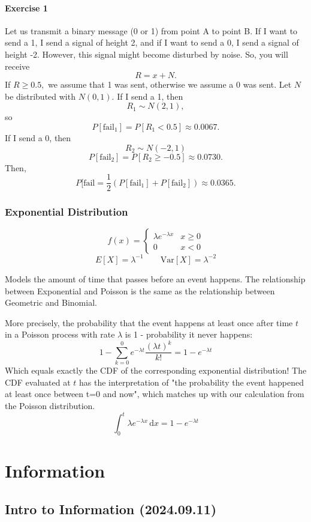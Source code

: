 \documentclass[12pt]{article}
\newcommand{\diffn}[1]{\,\mathrm{d}{#1}}
\begin{document}
\paragraph{Exercise 1}
Let us transmit a binary message (0 or 1) from point A to point B. If I want to send a 1, I send a signal of height 2, and if I want to send a 0, I send a signal of height -2. However, this signal might become disturbed by noise. So, you will receive
\[R=x+N.\]
If $R\ge 0.5,$ we assume that 1 was sent, otherwise we assume a 0 was sent.
Let $N$ be distributed with $N(0,1).$
If I send a 1, then
\[R_1\sim N(2,1),\]
so
\[P[\text{fail}_1]=P[R_1< 0.5]\approx 0.0067.\]
If I send a 0,
then
\[R_2\sim N(-2,1)\]
\[P[\text{fail}_2]=P[R_2\ge -0.5]\approx 0.0730.\]
Then,
\[P[\text{fail}=\frac{1}{2}(P[\text{fail}_1]+P[\text{fail}_2])\approx 0.0365.\]

\subsubsection{Exponential Distribution}
\[
f(x) = \begin{cases}
    \lambda e^{-\lambda x} & x \ge 0 \\
    0 & x < 0
\end{cases}
\]
\[
E[X] = \lambda^{-1} \qquad \text{Var}[X] = \lambda^{-2}
\]

Models the amount of time that passes before an event happens. The relationship between Exponential and Poisson is the same as the relationship between Geometric and Binomial.

More precisely, the probability that the event happens at least once after time $t$ in a Poisson process with rate $\lambda$ is 1 - probability it never happens:
\[
1 - \sum_{k=0}^0 e^{-\lambda t} \frac{(\lambda t)^k}{k!} = 1 - e^{-\lambda t}
\]
Which equals exactly the CDF of the corresponding exponential distribution! The CDF evaluated at $t$ has the interpretation of "the probability the event happened at least once between t=0 and now", which matches up with our calculation from the Poisson distribution.
\[
\int_0^t \lambda e^{-\lambda x} \diffn{x} = 1 - e^{-\lambda t}
\]

\section{Information}
\subsection{Intro to Information (2024.09.11)}
\end{document}
